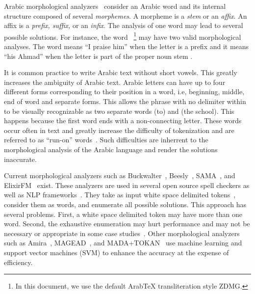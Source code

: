 \documentclass[12pt]{article}
\newcommand{\noTrRL}[1]{\transfalse\RL{#1}\transtrue}
\begin{document}


Arabic morphological analyzers~\cite{Sughaiyer:04}
consider an Arabic word and its internal structure composed of 
several {\em morphemes}. 
A morpheme is a {\em stem} or an {\em affix}.
An affix is a {\em prefix, suffix,} or an {\em infix}.
The analysis of one word may lead to several possible
solutions.
\vocalize
For instance, the word 
~\footnote{In this document, we use the default 
ArabTeX transliteration style ZDMG.}
may have two valid morphological analyses. 
The word means ``I praise him'' when
the letter  is a prefix and  it means
``his Ahmad'' when 
the letter  is part of the proper noun stem 
.
\novocalize

It is common practice to write Arabic text
without short vowels. 
This greatly increases the ambiguity of Arabic text. 
Arabic letters can have up to 
four different forms
corresponding to their position in a word, i.e, beginning,
middle, end of word and separate forms. 
This allows the phrase
\noTrRL{il_A\nospace almdrsT}  with no delimiter within
to be visually recognizable
as two separate words  (to) and  (the school).
This happens because the first word  ends with
 a non-connecting letter. 
These words occur often in text and greatly increase the
difficulty of tokenization and are referred to as 
``run-on'' words~\cite{Buckwalter:04}.
Such difficulties are inherrent to the 
morphological analysis of the Arabic language and
render the solutions inaccurate.

Current morphological analyzers such as 
Buckwalter~\cite{Buckwalter:02},
Beesly~\cite{Beesley:01}, SAMA~\cite{Kulick:10},
and ElixirFM~\cite{Otakar:07} exist.
These analyzers are used in several open source spell checkers as 
well as NLP frameworks~\cite{Col09}.
They take as input white space delimited tokens~\cite{Kulick:10},
consider them as words,
and enumerate all possible solutions. 
This approach has several problems. 
First, a white space delimited token may have 
more than one word.
Second, the exhaustive enumeration may hurt performance and may
not be necessary or appropriate
in some case studies~\cite{Maamouri:10}. 
Other morphological analyzers such as 
Amira~\cite{Diab:07,Benajiba:07},
MAGEAD~\cite{Habash:05}, and MADA+TOKAN~\cite{Habash:09} 
use machine learning and support vector machines (SVM) 
to enhance the accuracy at the expense of efficiency.
\end{document}
